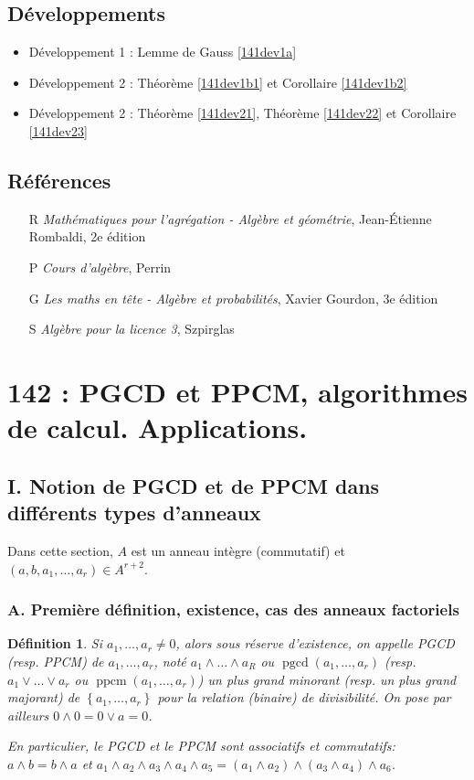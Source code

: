 \documentclass[10pt, a4paper, parskip=full, twoside, twocolumn]{report}
\newtheorem{definition}{Définition}
\DeclareMathOperator{\pgcd}{pgcd}
\DeclareMathOperator{\ppcm}{ppcm}
\begin{document}
\section*{Développements}
\begin{itemize}
	\item Développement 1 : Lemme de Gauss \ref{141dev1a}
	\item Développement 2 : Théorème \ref{141dev1b1} et Corollaire \ref{141dev1b2}
	\item Développement 2 : Théorème \ref{141dev21}, Théorème \ref{141dev22} et Corollaire \ref{141dev23}
\end{itemize}

\section*{Références}
\begin{itemize}
	\item[R] \emph{Mathématiques pour l'agrégation - Algèbre et géométrie}, Jean-Étienne Rombaldi, 2e édition
	\item[P] \emph{Cours d'algèbre}, Perrin
	\item[G] \emph{Les maths en tête - Algèbre et probabilités}, Xavier Gourdon, 3e édition
	\item[S] \emph{Algèbre pour la licence 3}, Szpirglas
\end{itemize}

\chapter*{142 : PGCD et PPCM, algorithmes de calcul. Applications.}
\setcounter{definition}{0}
\section*{I. Notion de PGCD et de PPCM dans différents types d'anneaux}
\textcolor{paragraphtext}{Dans cette section, $A$ est un anneau intègre (commutatif) et $(a,b,a_1,\dots,a_r)\in A^{r+2}$.}

\subsection*{A. Première définition, existence, cas des anneaux factoriels}

\begin{definition}
	Si $a_1,\dots,a_r \neq 0$, alors sous réserve d'existence, on appelle \emph{PGCD} (resp. \emph{PPCM})
	de $a_1,\dots, a_r$, noté $a_1\wedge \dots\wedge a_R$ ou $\pgcd(a_1,\dots,a_r)$ (resp. $a_1\vee\dots\vee a_r$ ou $\ppcm(a_1,\dots,a_r)$)
	un plus grand minorant (resp. un plus grand majorant) de $\left\{a_1,\dots, a_r\right\}$ pour la relation (binaire) de divisibilité.
	On pose par ailleurs $0\wedge 0 = 0\vee a = 0$.

	En particulier, le PGCD et le PPCM sont associatifs et commutatifs: $a\wedge b = b\wedge a$ et $a_1\wedge a_2 \wedge a_3\wedge a_4\wedge a_5 = (a_1\wedge a_2)\wedge(a_3\wedge a_4)\wedge a_6$.
\end{definition}
\end{document}
